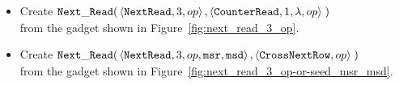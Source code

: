 \begin{itemize}
    \item Create
    $\begin{aligned}[t]
        {\tt Next\_Read}(& \left\langle {\tt NextRead},    3,          op \right\rangle,
                    \left\langle {\tt CounterRead}, 1, \lambda, op \right\rangle \;)
    \end{aligned}$\\from the gadget shown in Figure~\ref{fig:next_read_3_op}.

    \item Create
    $\begin{aligned}[t]
        {\tt Next\_Read}(& \left\langle {\tt NextRead}, 3,  op, {\tt msr}, {\tt msd} \right\rangle,
                    \left\langle {\tt CrossNextRow}, op \right\rangle \;)
    \end{aligned}$\\from the gadget shown in Figure~\ref{fig:next_read_3_op-or-seed_msr_msd}.
\end{itemize}

